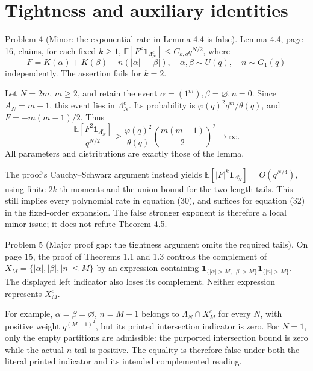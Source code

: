 \documentclass[10pt]{article}
\begin{document}
\section*{Tightness and auxiliary identities}
Problem 4 (Minor: the exponential rate in Lemma 4.4 is false).  Lemma 4.4, page 16, claims, for each fixed \(k\geq1\), \(\mathbb E[F^k\mathbf1_{\Lambda_N^c}]\leq C_{k,q}q^{N/2}\), where \[F=K(\alpha)+K(\beta)+n(|\alpha|-|\beta|),
\quad
\alpha,\beta\sim U(q),\quad n\sim G_1(q)\] independently. The assertion fails for \(k=2\).\par
Let \(N=2m\), \(m\geq2\), and retain the event \(\alpha=(1^m),\beta=\varnothing,n=0\). Since \(A_N=m-1\), this event lies in \(\Lambda_N^c\). Its probability is \(\varphi(q)^2q^m/\theta(q)\), and \(F=-m(m-1)/2\). Thus \[\frac{\mathbb E[F^2\mathbf1_{\Lambda_N^c}]}{q^{N/2}}
\geq \frac{\varphi(q)^2}{\theta(q)}
       \left(\frac{m(m-1)}2\right)^2\longrightarrow\infty.\] All parameters and distributions are exactly those of the lemma.\par
The proof’s Cauchy–Schwarz argument instead yields \(\mathbb E[|F|^k\mathbf1_{\Lambda_N^c}]=O(q^{N/4})\), using finite \(2k\)-th moments and the union bound for the two length tails. This still implies every polynomial rate in equation (30), and suffices for equation (32) in the fixed-order expansion. The false stronger exponent is therefore a local minor issue; it does not refute Theorem 4.5.\par
Problem 5 (Major proof gap: the tightness argument omits the required tails).  On page 15, the proof of Theorems 1.1 and 1.3 controls the complement of \(X_M=\{|\alpha|,|\beta|,|n|\leq M\}\) by an expression containing \(\mathbf1_{\{|\alpha|>M,\ |\beta|>M\}}\mathbf1_{\{|n|>M\}}\). The displayed left indicator also loses its complement. Neither expression represents \(X_M^c\).\par
For example, \(\alpha=\beta=\varnothing\), \(n=M+1\) belongs to \(\Lambda_N\cap X_M^c\) for every \(N\), with positive weight \(q^{(M+1)^2}\), but its printed intersection indicator is zero. For \(N=1\), only the empty partitions are admissible: the purported intersection bound is zero while the actual \(n\)-tail is positive. The equality is therefore false under both the literal printed indicator and its intended complemented reading.\par
\end{document}
